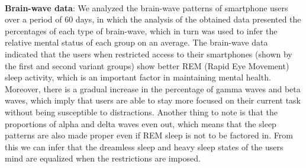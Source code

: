 \documentclass{article}
\begin{document}
\paragraph{} \textbf{Brain-wave data}: We analyzed the brain-wave patterns of smartphone users over a period of 60 days, in which the analysis of the obtained data presented the percentages of each type of brain-wave, which in turn was used to infer the relative mental status of each group on an average. The brain-wave data indicated that the users when restricted access to their smartphones (shown by the first and second variant groups) show better REM (Rapid Eye Movement) sleep activity, which is an important factor in maintaining mental health\cite{basics2016understanding}. Moreover, there is a gradual increase in the percentage of gamma waves and beta waves, which imply that users are able to stay more focused on their current task without being susceptible to distractions. Another thing to note is that the proportions of alpha and delta waves even out\cite{hauri1973alpha}, which means that the sleep patterns are also made proper even if REM sleep is not to be factored in. From this we can infer that the dreamless sleep and heavy sleep states of the users mind are equalized when the restrictions are imposed.
\end{document}
